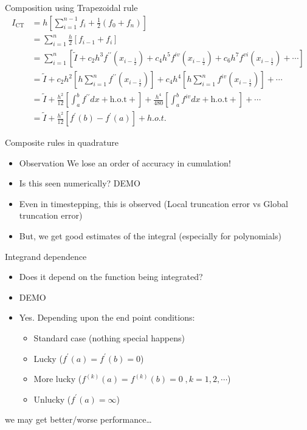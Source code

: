 \documentclass[presentation]{beamer}
\begin{document}
\begin{frame}[label={sec:org67e5604}]{Composition using Trapezoidal rule}
\[ \begin{aligned} I_{\text{CT}} &= h \left[ \sum_{i=1}^{n-1} f_i +
   \frac{1}{2}(f_0 + f_n) \right] \\
   &= \sum_{i=1}^{n}\frac{h}{2} \left[ f_{i-1} + f_{i}\right] \\
   &= \sum_{i=1}^{n} \left[ \tilde{I} +  c_2{h^3}f^{\prime\prime}(x_{i-\frac{1}{2}}) + c_4{h^5}f^{iv}(x_{i-\frac{1}{2}}) +
   c_6{h^7}f^{vi}(x_{i-\frac{1}{2}}) + \cdots \right] \\
   &= \tilde{I} + c_2h^2 \left[ h \sum_{i=1}^{n}
   f^{\prime\prime}(x_{i-\frac{1}{2}})\right] +  c_4h^4 \left[ h \sum_{i=1}^{n}
   f^{iv}(x_{i-\frac{1}{2}}) \right] + \cdots \\
   &= \tilde{I} + \frac{h^2}{12} \left[ \int_{a}^{b} f^{\prime\prime}dx +
   \text{h.o.t} + \right]  + \frac{h^4}{480} \left[ \int_{a}^{b} f^{iv}dx +
   \text{h.o.t} + \right] + \cdots \\
   &= \tilde{I} + \frac{h^2}{12} \left[ f^\prime(b) - f^\prime(a) \right] + h.o.t.
   \end{aligned}\]
\end{frame}
\begin{frame}[label={sec:org2856913}]{Composite rules in quadrature}
\begin{itemize}
\item \alert{Observation} We lose an order of accuracy in cumulation!
\item Is this seen numerically? \alert{DEMO}
\item Even in timestepping, this is observed (\alert{Local} truncation error vs
\alert{Global} truncation error)
\item But, we get good estimates of the integral (especially for polynomials)
\end{itemize}
\end{frame}
\begin{frame}[label={sec:org5ab78d4}]{Integrand dependence}
\begin{itemize}
\item Does it depend on the function being integrated?
\item \alert{DEMO}
\item \alert{Yes}. Depending upon the end point conditions:
\begin{itemize}
\item Standard case (nothing special happens)
\item Lucky (\(f^\prime(a) = f^\prime(b) = 0\))
\item More lucky (\(f^{(k)}(a) = f^{(k)}(b) = 0 \;, k = 1,2,\cdots\))
\item Unlucky (\(f^{\prime}(a) = \infty\))
\end{itemize}
\end{itemize}
we may get better/worse performance\ldots{}
\end{frame}
\end{document}
